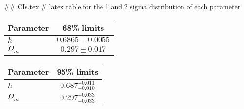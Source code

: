 ## CIs.tex
# latex table for the 1 and 2 sigma distribution of each parameter

\begin{tabular} { l  c}
 Parameter &  68\% limits\\
\hline
{\boldmath$h              $} & $0.6865\pm 0.0055          $\\
{\boldmath$\Omega_m       $} & $0.297\pm 0.017            $\\
\hline
\end{tabular}

\begin{tabular} { l  c}
 Parameter &  95\% limits\\
\hline
{\boldmath$h              $} & $0.687^{+0.011}_{-0.010}   $\\
{\boldmath$\Omega_m       $} & $0.297^{+0.033}_{-0.033}   $\\
\hline
\end{tabular}
